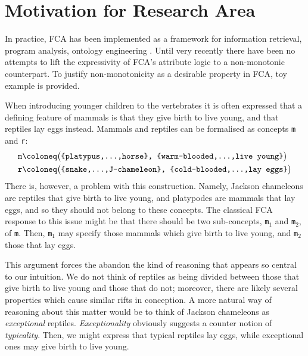 \section{Motivation for Research Area}
\label{section: motivation}

In practice, FCA has been implemented as a framework for information retrieval, program analysis, ontology engineering \cite{poelmans2013formal,haav2004semi,poelmans2012text}. Until very recently \cite{carr2024nonmonotonicextensionsformalconcept,ding2024defeasiblereasoningconcepts} there have been no attempts to lift the expressivity of FCA's attribute logic to a non-monotonic counterpart. To justify non-monotonicity as a desirable property in FCA, toy example is provided.

When introducing younger children to the vertebrates it is often expressed that a defining feature of mammals is that they give birth to live young, and that reptiles lay eggs instead. Mammals and reptiles can be formalised as concepts \texttt{m} and \texttt{r}:
\small
\[
    \begin{aligned}
         & \texttt{m} \coloneq \texttt{\big(\{platypus,\ldots,horse\}, \{warm-blooded,\ldots,live young\}\big)}  \\
         & \texttt{r} \coloneq \texttt{\big(\{snake,\ldots,J-chameleon\}, \{cold-blooded,\ldots,lay eggs\}\big)}
    \end{aligned}
\]
\normalsize
There is, however, a problem with this construction. Namely, Jackson chameleons are reptiles that give birth to live young, and platypodes are mammals that lay eggs, and so they should not belong to these concepts. The classical FCA response to this issue might be that there should be two sub-concepts, \texttt{m$_1$} and \texttt{m$_2$}, of \texttt{m}. Then, \texttt{m$_1$} may specify those mammals which give birth to live young, and \texttt{m$_2$} those that lay eggs.

This argument forces the abandon the kind of reasoning that appears so central to our intuition. We do not think of reptiles as being divided between those that give birth to live young and those that do not; moreover, there are likely several properties which cause similar rifts in conception. A more natural way of reasoning about this matter would be to think of Jackson chameleons as \textit{exceptional} reptiles. \textit{Exceptionality} obviously suggests a counter notion of \textit{typicality}. Then, we might express that typical reptiles lay eggs, while exceptional ones may give birth to live young.


